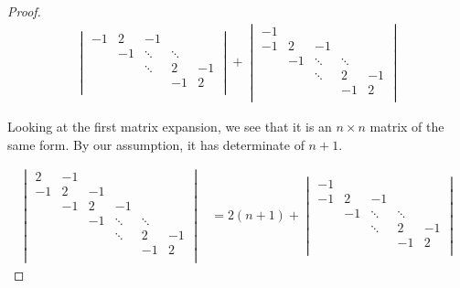 \documentclass[12pt,letterpaper]{article}
\begin{document}
\begin{enumerate}
\begin{proof}
\begin{align*}
\begin{vmatrix}
              -1 & 2      & -1     &        &        \\
                 & -1     & \ddots & \ddots &        \\
                 &        & \ddots & 2      & -1     \\
                 &        &        & -1     & 2      \\
            \end{vmatrix}
            +
            \begin{vmatrix}
              -1 &        &        &        &        \\
              -1 & 2      & -1     &        &        \\
                 & -1     & \ddots & \ddots &        \\
                 &        & \ddots & 2      & -1     \\
                 &        &        & -1     & 2      \\
            \end{vmatrix}
        \end{align*}

        Looking at the first matrix expansion, we see that it is an $n \times n$ matrix of the same form.
        By our assumption, it has determinate of $n + 1$.

        \begin{align*}
          \begin{vmatrix}
            2  & -1 &        &        &        &        \\
            -1 & 2  & -1     &        &        &        \\
               & -1 & 2      & -1     &        &        \\
               &    & -1     & \ddots & \ddots &        \\
               &    &        & \ddots & 2      & -1     \\
               &    &        &        & -1     & 2      \\
          \end{vmatrix}
          &= 2(n + 1)
            +
            \begin{vmatrix}
              -1 &        &        &        &        \\
              -1 & 2      & -1     &        &        \\
                 & -1     & \ddots & \ddots &        \\
                 &        & \ddots & 2      & -1     \\
                 &        &        & -1     & 2      \\
            \end{vmatrix}
        \end{align*}


\end{proof}
\end{enumerate}
\end{document}

